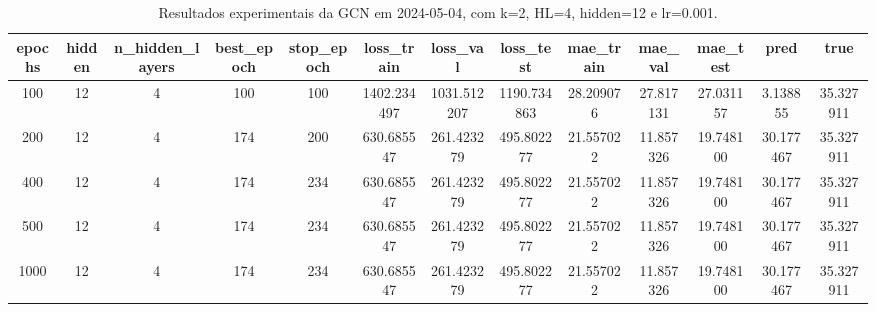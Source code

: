 \begin{table}[h]
\centering
\caption{Resultados experimentais da GCN em 2024-05-04, com k=2, HL=4, hidden=12 e lr=0.001.}
\label{tab:gcn_results_k2_hl4_h12_d20240504}
\begin{tabular}{ccccccccccccc}
\toprule
epochs & hidden & n\_hidden\_layers & best\_epoch & stop\_epoch & loss\_train & loss\_val & loss\_test & mae\_train & mae\_val & mae\_test & pred & true \\
\midrule
100 & 12 & 4 & 100 & 100 & 1402.234497 & 1031.512207 & 1190.734863 & 28.209076 & 27.817131 & 27.031157 & 3.138855 & 35.327911 \\
200 & 12 & 4 & 174 & 200 & 630.685547 & 261.423279 & 495.802277 & 21.557022 & 11.857326 & 19.748100 & 30.177467 & 35.327911 \\
400 & 12 & 4 & 174 & 234 & 630.685547 & 261.423279 & 495.802277 & 21.557022 & 11.857326 & 19.748100 & 30.177467 & 35.327911 \\
500 & 12 & 4 & 174 & 234 & 630.685547 & 261.423279 & 495.802277 & 21.557022 & 11.857326 & 19.748100 & 30.177467 & 35.327911 \\
1000 & 12 & 4 & 174 & 234 & 630.685547 & 261.423279 & 495.802277 & 21.557022 & 11.857326 & 19.748100 & 30.177467 & 35.327911 \\
\bottomrule
\end{tabular}
\end{table}
